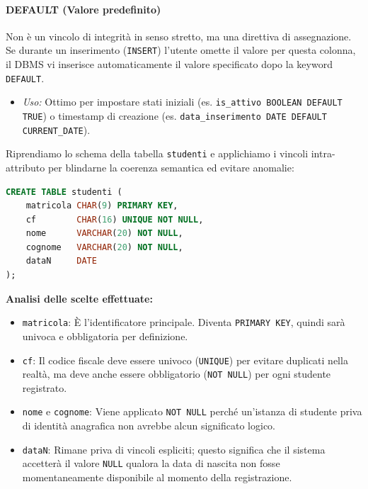 \paragraph{DEFAULT (Valore predefinito)}
Non è un vincolo di integrità in senso stretto, ma una direttiva di assegnazione. Se durante un inserimento (\texttt{INSERT}) l'utente omette il valore per questa colonna, il DBMS vi inserisce automaticamente il valore specificato dopo la keyword \texttt{DEFAULT}.
\begin{itemize}
    \item \textit{Uso:} Ottimo per impostare stati iniziali (es. \texttt{is\_attivo BOOLEAN DEFAULT TRUE}) o timestamp di creazione (es. \texttt{data\_inserimento DATE DEFAULT CURRENT\_DATE}).
\end{itemize}

\begin{example}
Riprendiamo lo schema della tabella \texttt{studenti} e applichiamo i vincoli intra-attributo per blindarne la coerenza semantica ed evitare anomalie:

\begin{lstlisting}[language=SQL, basicstyle=\ttfamily\small, keywordstyle=\color{blue}\bfseries]
CREATE TABLE studenti (
    matricola CHAR(9) PRIMARY KEY,
    cf        CHAR(16) UNIQUE NOT NULL,
    nome      VARCHAR(20) NOT NULL,
    cognome   VARCHAR(20) NOT NULL,
    dataN     DATE
);
\end{lstlisting}

\textbf{Analisi delle scelte effettuate:}
\begin{itemize}
    \item \texttt{matricola}: È l'identificatore principale. Diventa \texttt{PRIMARY KEY}, quindi sarà univoca e obbligatoria per definizione.
    \item \texttt{cf}: Il codice fiscale deve essere univoco (\texttt{UNIQUE}) per evitare duplicati nella realtà, ma deve anche essere obbligatorio (\texttt{NOT NULL}) per ogni studente registrato.
    \item \texttt{nome} e \texttt{cognome}: Viene applicato \texttt{NOT NULL} perché un'istanza di studente priva di identità anagrafica non avrebbe alcun significato logico.
    \item \texttt{dataN}: Rimane priva di vincoli espliciti; questo significa che il sistema accetterà il valore \texttt{NULL} qualora la data di nascita non fosse momentaneamente disponibile al momento della registrazione.
\end{itemize}
\end{example}

